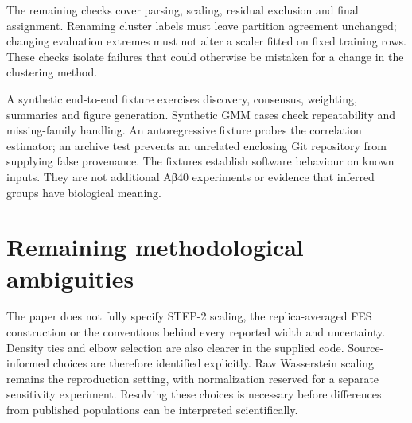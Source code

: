 The remaining checks cover parsing, scaling, residual exclusion and final assignment. Renaming cluster labels must leave partition agreement unchanged; changing evaluation extremes must not alter a scaler fitted on fixed training rows. These checks isolate failures that could otherwise be mistaken for a change in the clustering method.

A synthetic end-to-end fixture exercises discovery, consensus, weighting, summaries and figure generation. Synthetic GMM cases check repeatability and missing-family handling. An autoregressive fixture probes the correlation estimator; an archive test prevents an unrelated enclosing Git repository from supplying false provenance. The fixtures establish software behaviour on known inputs. They are not additional Aβ40 experiments or evidence that inferred groups have biological meaning.

\section{Remaining methodological ambiguities}
The paper does not fully specify STEP-2 scaling, the replica-averaged FES construction or the conventions behind every reported width and uncertainty. Density ties and elbow selection are also clearer in the supplied code. Source-informed choices are therefore identified explicitly. Raw Wasserstein scaling remains the reproduction setting, with normalization reserved for a separate sensitivity experiment. Resolving these choices is necessary before differences from published populations can be interpreted scientifically.
